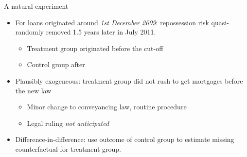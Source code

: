 \documentclass[ignorenonframetext,aspectratio=169]{beamer}
\providecommand{\tightlist}{%
  \setlength{\itemsep}{0pt}\setlength{\parskip}{0pt}}
\begin{document}
\begin{frame}{A natural experiment}

\begin{itemize}
\tightlist
\item
  For loans originated around \emph{1st December 2009}: repossession
  risk quasi-randomly removed 1.5 years later in July 2011.

  \begin{itemize}
  \tightlist
  \item
    Treatment group originated before the cut-off
  \item
    Control group after
  \end{itemize}
\item
  Plausibly exogeneous: treatment group did not rush to get mortgages
  before the new law

  \begin{itemize}
  \tightlist
  \item
    Minor change to conveyancing law, routine procedure
  \item
    Legal ruling \emph{not anticipated}
  \end{itemize}
\item
  Difference-in-difference: use outcome of control group to estimate
  missing counterfactual for treatment group.
\end{itemize}

\end{frame}
\end{document}

